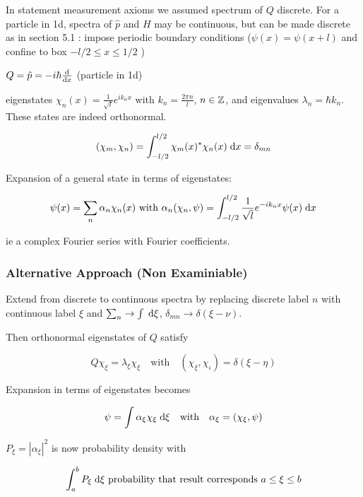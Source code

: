 \documentclass[a4paper]{article}
\begin{document}
In statement measurement axioms we assumed spectrum of $ Q $ discrete. For a particle in 1d, spectra of $ \hat{p} $ and $ H $ may be continuous, but can be made discrete as in section 5.1 : impose periodic boundary conditions ($ \psi(x) = \psi(x + l) $  and confine to box $ -l / 2 \leq x \leq 1/2 $ ) 


\begin{eg}
	$ Q = \hat{p} = - i \hbar \frac{\mathrm{d} }{\mathrm{d} x} $ (particle in 1d)
	
	eigenstates $ \chi_{n}(x) = \frac{1}{\sqrt{l}} e^{i k_{n} x }  $ with $ k_{n} = \frac{2 \pi n}{l} $, $ n \in \mathbb{Z} $, and eigenvalues $ \lambda_{n} = \hbar k_{n} $. These states are indeed orthonormal. 
\end{eg}

\[ (\chi_{m},\chi_{n})  = \int_{- l / 2}^{l / 2}  \chi_{m}(x)^{*} \chi_{n}(x) \; \mathrm{d} x = \delta_{mn}     \]

Expansion of a general state in terms of eigenstates:

\[ \psi(x)  = \sum_{n} \alpha_{n} \chi_{n}(x)  \text{ with } \alpha_{n} (\chi_{n},\psi) = \int_{- l/2}^{l/2} \frac{1}{\sqrt{l}} e^{-i k_{n} x } \psi(x) \; \mathrm{d} x    \]

ie a complex Fourier series with Fourier coefficients.

\subsubsection{Alternative Approach (Non Examiniable)}

Extend from discrete to continuous spectra by replacing discrete label $ n $ with continuous label $ \xi $ and $ \sum_{n} \to \int \; \mathrm{d} \xi $, $ \delta_{mn} \to \delta( \xi - \nu) $.

Then orthonormal eigenstates of $ Q $ satisfy

\[ Q \chi_{\xi} = \lambda_{\xi} \chi_{\xi} \quad \text{with} \quad (\chi_{\xi},\chi_{\iota})  = \delta(\xi - \eta)   \]

Expansion in terms of eigenstates becomes

\[ \psi = \int \alpha_{\xi} \chi_{\xi} \; \mathrm{d} \xi   \quad \text{with} \quad \alpha_{\xi} = (\chi_{\xi},\psi )  \]

$  P_{\xi} = | \alpha_{\xi} |^{2} $ is now probability density with 

\[ \int_{a}^{b} P_{\xi} \; \mathrm{d} \xi \text{ probability that result corresponds } a \leq \xi \leq b \]
\end{document}
